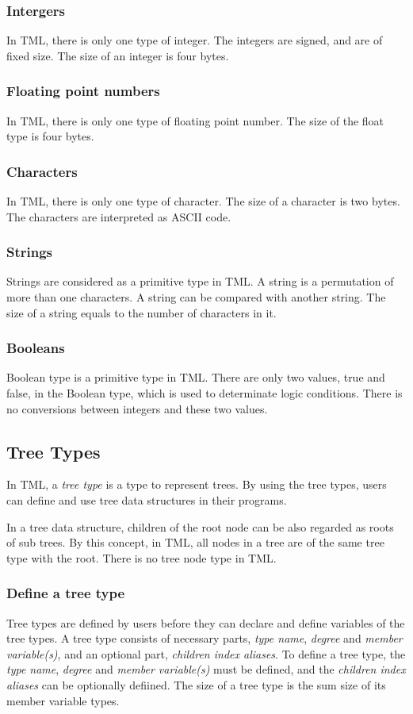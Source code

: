 \documentclass[12pt,psfig,a4]{article}
\begin{document}
\subsubsection {Intergers}
In TML, there is only one type of integer. The integers are signed, and are of fixed size. The size of an integer is four bytes.

\subsubsection {Floating point numbers}
In TML, there is only one type of floating point number. The size of the float type is four bytes.

\subsubsection {Characters}
In TML, there is only one type of character. The size of a character is two bytes. The characters are interpreted as ASCII code.

\subsubsection {Strings}
Strings are considered as a primitive type in TML. A string is a permutation of more than one characters. A string can be compared with another string. The size of a string equals to the number of characters in it.

\subsubsection {Booleans}
Boolean type is a primitive type in TML. There are only two values, true and false, in the Boolean type, which is used to determinate logic conditions. There is no conversions between integers and these two values.

\subsection {Tree Types}
In TML, a \textit{tree type} is a type to represent trees. By using the tree types, users can define and use tree data structures in their programs.

In a tree data structure, children of the root node can be also regarded as roots of sub trees. By this concept, in TML, all nodes in a tree are of the same tree type with the root. There is no tree node type in TML.

\subsubsection {Define a tree type}
\label{defTreetype}
Tree types are defined by users before they can declare and define variables of the tree types. A tree type consists of necessary parts, \textit{type name}, \textit{degree} and \textit{member variable(s)}, and an optional part, \textit{children index aliases}. To define a tree type, the \textit{type name}, \textit{degree} and \textit{member variable(s)} must be defined, and the \textit{children index aliases} can be optionally defiined. The size of a tree type is the sum size of its member variable types.
\end{document}
